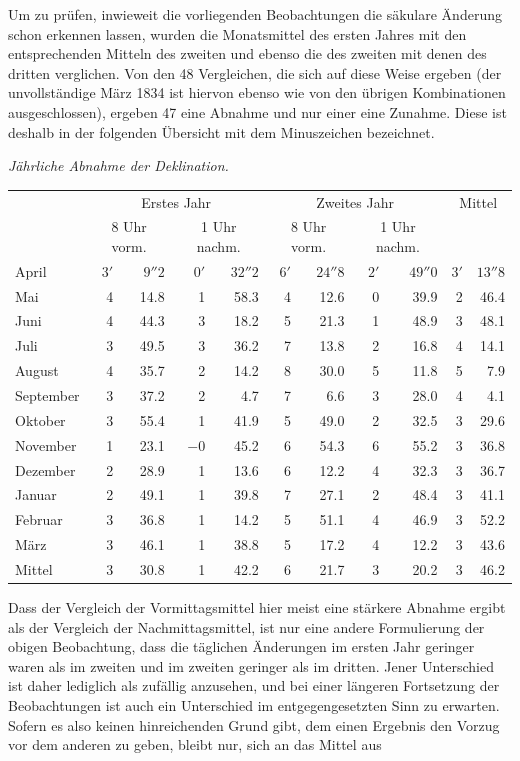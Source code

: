 Um zu prüfen, inwieweit die vorliegenden Beobachtungen die säkulare Änderung schon erkennen lassen, wurden die Monatsmittel des ersten Jahres mit den entsprechenden Mitteln des zweiten und ebenso die des zweiten mit denen des dritten verglichen. Von den 48 Vergleichen, die sich auf diese Weise ergeben (der unvollständige März 1834 ist hiervon ebenso wie von den übrigen Kombinationen ausgeschlossen), ergeben 47 eine Abnahme und nur einer eine Zunahme. Diese ist deshalb in der folgenden Übersicht mit dem Minuszeichen bezeichnet.
\begin{center}\small\setlength{\tabcolsep}{3pt}
\textit{Jährliche Abnahme der Deklination.}\par\smallskip
\begin{tabular}{l||rr|rr||rr|rr||rr}
&\multicolumn{4}{c||}{Erstes Jahr}&\multicolumn{4}{c||}{Zweites Jahr}&\multicolumn{2}{c}{Mittel}\\
&\multicolumn{2}{c|}{8 Uhr vorm.}&\multicolumn{2}{c||}{1 Uhr nachm.}&\multicolumn{2}{c|}{8 Uhr vorm.}&\multicolumn{2}{c||}{1 Uhr nachm.}&&\\\hline\hline
April&$3'$&$9''2$&$0'$&$32''2$&$6'$&$24''8$&$2'$&$49''0$&$3'$&$13''8$\\
Mai&4&14.8&1&58.3&4&12.6&0&39.9&2&46.4\\
Juni&4&44.3&3&18.2&5&21.3&1&48.9&3&48.1\\
Juli&3&49.5&3&36.2&7&13.8&2&16.8&4&14.1\\
August&4&35.7&2&14.2&8&30.0&5&11.8&5&7.9\\
September&3&37.2&2&4.7&7&6.6&3&28.0&4&4.1\\
Oktober&3&55.4&1&41.9&5&49.0&2&32.5&3&29.6\\
November&1&23.1&$-0$&45.2&6&54.3&6&55.2&3&36.8\\
Dezember&2&28.9&1&13.6&6&12.2&4&32.3&3&36.7\\
Januar&2&49.1&1&39.8&7&27.1&2&48.4&3&41.1\\
Februar&3&36.8&1&14.2&5&51.1&4&46.9&3&52.2\\
März&3&46.1&1&38.8&5&17.2&4&12.2&3&43.6\\\hline\hline
Mittel&3&30.8&1&42.2&6&21.7&3&20.2&3&46.2
\end{tabular}
\end{center}
Dass der Vergleich der Vormittagsmittel hier meist eine stärkere Abnahme ergibt als der Vergleich der Nachmittagsmittel, ist nur eine andere Formulierung der obigen Beobachtung, dass die täglichen Änderungen im ersten Jahr geringer waren als im zweiten und im zweiten geringer als im dritten. Jener Unterschied ist daher lediglich als zufällig anzusehen, und bei einer längeren Fortsetzung der Beobachtungen ist auch ein Unterschied im entgegengesetzten Sinn zu erwarten. Sofern es also keinen hinreichenden Grund gibt, dem einen Ergebnis den Vorzug vor dem anderen zu geben, bleibt nur, sich an das Mittel aus

